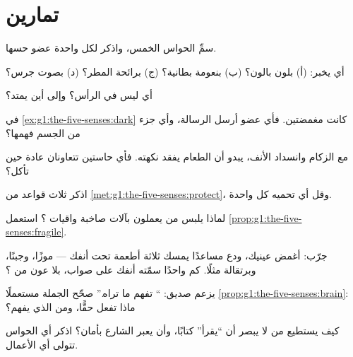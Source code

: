 \section{تمارين}

\begin{exercise}[$\star$]\label{exo:g1:the-five-senses:1}
سمِّ الحواس الخمس، واذكر لكل واحدة عضو حسها.
\end{exercise}

\begin{exercise}[$\star$]\label{exo:g1:the-five-senses:2}
أي  يخبر: (أ) بلون بالون؟ (ب) بنعومة بطانية؟ (ج) برائحة
المطر؟ (د) بصوت جرس؟
\end{exercise}

\begin{exercise}[$\star$]\label{exo:g1:the-five-senses:3}
أي  ليس في الرأس؟ وإلى أين يمتد؟
\end{exercise}

\begin{exercise}[$\star$]\label{exo:g1:the-five-senses:4}
في \cref{ex:g1:the-five-senses:dark} كانت  مغمضتين. فأي
عضو أرسل الرسالة، وأي جزء من الجسم فهمها؟
\end{exercise}

\begin{exercise}[$\star$]\label{exo:g1:the-five-senses:5}
مع الزكام وانسداد الأنف، يبدو أن الطعام يفقد نكهته. فأي حاستين
تتعاونان عادة حين تأكل؟
\end{exercise}

\begin{exercise}[$\star$]\label{exo:g1:the-five-senses:6}
اذكر ثلاث قواعد من \cref{met:g1:the-five-senses:protect}، وقل أي
 تحميه كل واحدة.
\end{exercise}

\begin{exercise}[$\star$]\label{exo:g1:the-five-senses:7}
لماذا يلبس من يعملون بآلات صاخبة واقيات ؟ استعمل
\cref{prop:g1:the-five-senses:fragile}.
\end{exercise}

\begin{exercise}[$\star$]\label{exo:g1:the-five-senses:8}
جرّب: أغمض عينيك، ودع مساعدًا يمسك ثلاثة أطعمة تحت أنفك --- موزًا،
وجبنًا، وبرتقالة مثلًا. كم واحدًا سمّته أنفك على صواب، بلا عون من
؟
\end{exercise}

\begin{exercise}[$\star\star$]\label{exo:g1:the-five-senses:9}
يزعم صديق: `` تفهم ما تراه.'' صحّح الجملة مستعملًا
\cref{prop:g1:the-five-senses:brain}: ماذا تفعل  حقًّا، ومن
الذي يفهم؟
\end{exercise}

\begin{exercise}[$\star\star$]\label{exo:g1:the-five-senses:10}
كيف يستطيع من لا يبصر أن ``يقرأ'' كتابًا، وأن يعبر الشارع بأمان؟
اذكر أي الحواس تتولى أي الأعمال.
\end{exercise}
